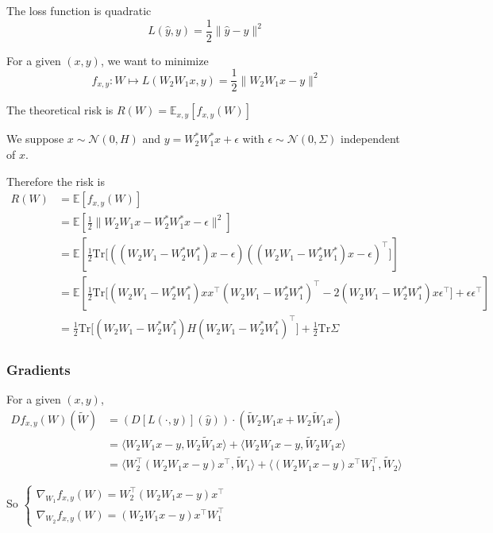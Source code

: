 \documentclass{article}
\newcommand{\E}{\mathbb{E}}
\newcommand{\tr}{\mathrm{Tr}}
\begin{document}
The loss function is quadratic \[L(\hat y,y) = \frac{1}{2} \|\hat y-y \|^2\]


For a given $(x,y)$, we want to minimize \[f_{x,y}:W \mapsto L(W_2W_1x, y) = \frac{1}{2} \|W_2W_1 x - y\|^2 \]

The theoretical risk is $R(W) = \E_{x,y}[f_{x,y}(W)]$

\bigskip

We suppose $x \sim \mathcal N(0, H)$ and $y = W_2^*W_1^*x+\epsilon$ with $\epsilon \sim \mathcal N(0,\Sigma)$ independent of $x$.



Therefore the risk is 
\begin{align*}
R(W)  &= \E[f_{x,y}(W)]
\\&=
\E\left[\frac{1}{2} \|W_2W_1 x - W_2^*W_1^*x-\epsilon\|^2 \right]
\\&=
\E\left[\frac{1}{2} \tr \big[((W_2W_1 - W_2^*W_1^*)x-\epsilon)((W_2W_1 - W_2^*W_1^*)x-\epsilon)^\top \big] \right]
\\&=
\E\left[\frac{1}{2} \tr \big[(W_2W_1 - W_2^*W_1^*)xx^\top (W_2W_1 - W_2^*W_1^*)^\top -2 (W_2W_1 - W_2^*W_1^*) x \epsilon^\top\big] + \epsilon \epsilon ^\top \right]
\\&= \frac{1}{2}\tr \big[(W_2W_1 - W_2^*W_1^*)H (W_2W_1 - W_2^*W_1^*)^\top ] + \frac{1}{2} \tr\Sigma
\end{align*}



\subsubsection{Gradients}

\newcommand{\wa}{\tilde W_1}
\newcommand{\wb}{\tilde W_2}




For a given $(x,y)$,
\begin{align*}
Df_{x,y}(W) (\tilde W) &= 
\left( D[L(\cdot , y)](\hat y) \right)\cdot(\wb W_1x +W_2 \wa x)
\\&=
\langle W_2 W_1x - y, W_2\wa x \rangle + \langle W_2 W_1x - y , \wb W_1x \rangle
\\&=
\langle W_2^\top(W_2 W_1x - y)x^\top, \wa \rangle + \langle (W_2 W_1x - y )x^\top W_1^\top, \wb \rangle
\end{align*}

So 
$\left\{\begin{array}{l}
\nabla_{W_1}f_{x,y}(W) = W_2^\top(W_2 W_1x - y)x^\top\\
\nabla_{W_2}f_{x,y}(W) = (W_2 W_1x - y )x^\top W_1^\top
\end{array}\right.$
\end{document}
